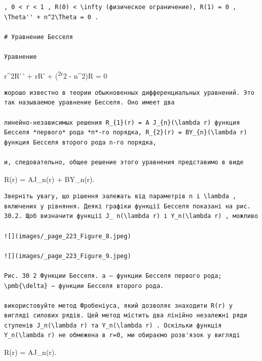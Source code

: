 \documentclass[
  ukrainian,
]{article}
\begin{document}
\begin{verbatim}
, 0 < r < 1 , R(0) < \infty (физическое ограничение), R(1) = 0 , \Theta'' + n^2\Theta = 0 .

# Уравнение Бесселя

Уравнение
\end{verbatim}

r\^{}2R'\,' + rR' + (\lambda\textsuperscript{2r}2 - n\^{}2)R = 0

\begin{verbatim}
жорошо известно в теории обыкновенных дифференциальных уравнений. Это так называемое уравнение Бесселя. Оно имеет два

линейно-независимых решения R_{1}(r) = A J_{n}(\lambda r) функция Бесселя *первого* рода *п*-го порядка, R_{2}(r) = BY_{n}(\lambda r) функция Бесселя второго рода n-го порядка,

и, следовательно, общее решение этого уравнения представимо в виде
\end{verbatim}

R(r) = AJ\_n(\lambda r) + BY\_n(\lambda r).

\begin{verbatim}
Зверніть увагу, що рішення залежать від параметрів n і \lambda , включених у рівняння. Деякі графіки функції Бесселя показані на рис. 30.2. Щоб визначити функції J_ n(\lambda r) і Y_n(\lambda r) , можливо

![](images/_page_223_Figure_8.jpeg)

![](images/_page_223_Figure_9.jpeg)

Рис. 30 2 Функции Бесселя. a — функции Бесселя первого рода; \pmb{\delta} — функции Бесселя второго рода.

використовуйте метод Фробеніуса, який дозволяє знаходити R(r) у вигляді силових рядів. Цей метод містить два лінійно незалежні ряди ступенів J_n(\lambda r) та Y_n(\lambda r) . Оскільки функція Y_n(\lambda r) не обмежена в r=0, ми обираємо розв'язок у вигляді
\end{verbatim}

R(r) = AJ\_n(\lambda r).
\end{document}
